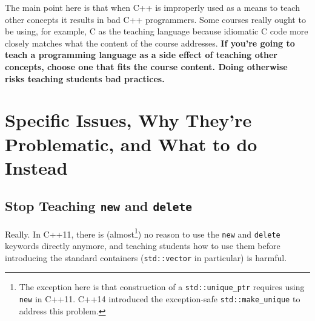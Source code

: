 \documentclass{article}
\newcommand{\uniqueptr}{\texttt{std::unique\_ptr}}
\newcommand{\CppNew}{\texttt{new}}
\newcommand{\CppDelete}{\texttt{delete}}
\begin{document}
 The main point here is that when C++ is improperly used as a means to teach other concepts it results in bad C++ programmers.  Some courses really ought to be using, for example, C as the teaching language because idiomatic C code more closely matches what the content of the course addresses.  \textbf{If you're going to teach a programming language as a side effect of teaching other concepts, choose one that fits the course content.  Doing otherwise risks teaching students bad practices.}

\section*{Specific Issues, Why They're Problematic, and What to do Instead}

\subsection*{Stop Teaching \CppNew{} and \CppDelete{}}
Really.  In C++11, there is (almost\footnote{The exception here is that construction of a \uniqueptr{} requires using \CppNew{} in C++11. C++14 introduced the exception-safe \texttt{std::make\_unique} to address this problem.}) no reason to use the \CppNew{} and \CppDelete{} keywords directly anymore, and teaching students how to use them before introducing the standard containers (\texttt{std::vector} in particular) is harmful.  
\end{document}
